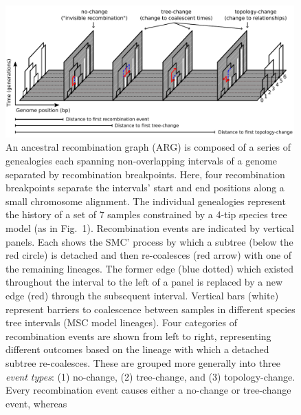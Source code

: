 \documentclass[11pt]{article}
\begin{document}
\begin{figure}[t]
	\centering
	\includegraphics[width=0.99\textwidth]{figures/Fig2-ARG-recomb-types.pdf}
	\caption{
		An ancestral recombination graph (ARG)
		is composed of a series of genealogies each spanning non-overlapping 
		intervals of a genome separated by recombination breakpoints. Here, 
		four recombination breakpoints separate the intervals' start and end positions 
		along a small chromosome alignment. The individual genealogies represent the history of a set of 7 samples constrained
		by a 4-tip species tree model (as in Fig.~1).
		Recombination events are indicated by vertical panels. Each shows the SMC' process by 
		which a subtree (below the red circle) is detached and then re-coalesces (red arrow)
		with one of the remaining lineages. %
		The former edge (blue dotted) which existed throughout the interval to the left of a 
		panel is replaced by a new edge (red) through the subsequent interval. Vertical bars 
		(white) represent barriers to coalescence between samples in different species
		tree intervals (MSC model lineages).
		Four categories of recombination events are shown from left to right, representing
		different outcomes based on the lineage with which a detached subtree re-coalesces.
		These are grouped more generally into 
		three \emph{event types}: (1) no-change, (2) tree-change, and (3) topology-change.
		Every recombination event causes either a no-change or tree-change event, whereas
}
\end{figure}
\end{document}
